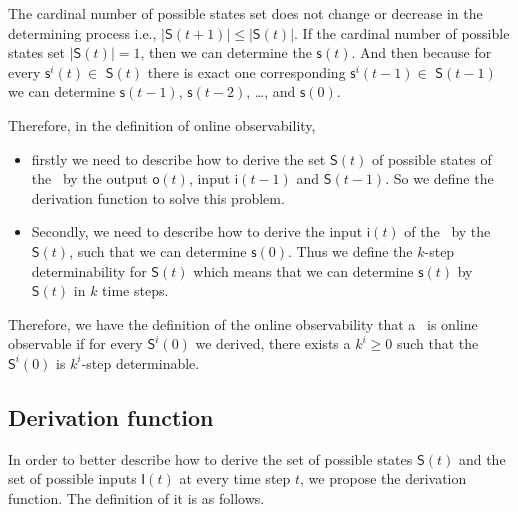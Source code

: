  The cardinal number of possible states set does not change or decrease in the determining process i.e., $|\mathsf{S}(t+1)|\le|\mathsf{S}(t)|$. %
 If the cardinal number of possible states set $|\mathsf{S}(t)|=1$, then we can determine the $\mathsf{s}(t)$. And then because for every $\mathsf{s}^{i}(t)\in $ $\mathsf{S}(t)$ there is exact one corresponding $\mathsf{s}^{i}(t-1)\in $ $\mathsf{S}(t-1)$ we can determine $\mathsf{s}(t-1)$, $\mathsf{s}(t-2)$, \ldots, and $\mathsf{s}(0)$.

Therefore, in the definition of online observability, 
\begin{itemize}
\item firstly we need to describe how to derive the set $\mathsf{S}(t)$ of possible states of the \BCN\ by the output $\mathsf{o}(t)$, input $\mathsf{i}(t-1)$ and $\mathsf{S}(t-1)$. So we define the derivation function to solve this problem.
\item  Secondly, we need to describe how to derive the input $\mathsf{i}(t)$ of the \BCN\ by the $\mathsf{S}(t)$, such that we can determine $\mathsf{s}(0)$. Thus we define the $k$-step determinability for $\mathsf{S}(t)$ which means that we can determine $\mathsf{s}(t)$ by $\mathsf{S}(t)$ in $k$ time steps.
\end{itemize} 

Therefore, we have the definition of the online observability that a \BCN\ is online observable if for every $\mathsf{S}^{i}(0)$ we derived, there exists a $k^i\ge 0$ such that the $\mathsf{S}^{i}(0)$ is $k^i$-step determinable.


\subsection{Derivation function}

In order to better describe how to derive the set of possible states $\mathsf{S}(t)$ and the set of possible inputs $\mathsf{I}(t)$ at every time step $t$, we propose the derivation function. The definition of it is as follows.

